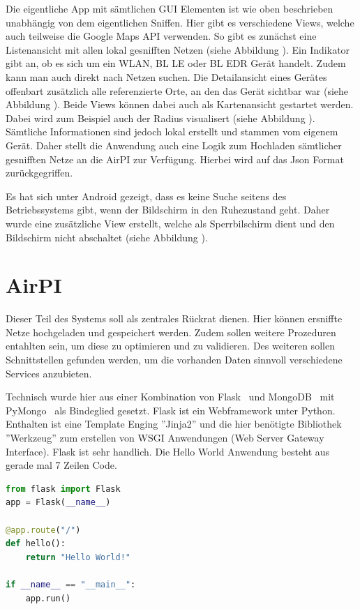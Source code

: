 \documentclass[11pt,a4paper]{article}
\begin{document}
Die eigentliche App mit sämtlichen GUI Elementen ist wie oben beschrieben unabhängig von dem eigentlichen Sniffen. Hier gibt es verschiedene Views, welche auch teilweise die Google Maps API verwenden.
So gibt es zunächst eine Listenansicht mit allen lokal gesnifften Netzen (siehe Abbildung
). Ein Indikator gibt an, ob es sich um ein WLAN, BL LE oder BL EDR Gerät handelt. Zudem kann man auch direkt nach Netzen suchen. Die Detailansicht eines Gerätes offenbart zusätzlich alle referenzierte Orte, an den das Gerät sichtbar war (siehe Abbildung
). Beide Views können dabei auch als Kartenansicht gestartet werden. Dabei wird zum Beispiel auch der Radius visualisert (siehe Abbildung
). Sämtliche Informationen sind jedoch lokal erstellt und stammen vom eigenem Gerät. Daher stellt die Anwendung auch eine Logik zum Hochladen sämtlicher gesnifften Netze an die AirPI zur Verfügung. Hierbei wird auf das Json Format zurückgegriffen. 

Es hat sich unter Android gezeigt, dass es keine Suche seitens des Betriebssystems gibt, wenn der Bildschirm in den Ruhezustand geht. Daher wurde eine zusätzliche View erstellt, welche als Sperrbilschirm dient und den Bildschirm nicht abschaltet (siehe Abbildung
).


\section{AirPI}

Dieser Teil des Systems soll als zentrales Rückrat dienen. Hier können ersniffte Netze hochgeladen und gespeichert werden. Zudem sollen weitere Prozeduren entahlten sein, um diese zu optimieren und zu validieren. 
Des weiteren sollen Schnittstellen gefunden werden, um die vorhanden Daten sinnvoll  verschiedene Services anzubieten.

Technisch wurde hier aus einer Kombination von Flask~\cite{flask} und MongoDB~\cite{mongodb} mit PyMongo~\cite{pymongo} als Bindeglied gesetzt. Flask ist ein Webframework unter Python. Enthalten ist eine Template Enging ''Jinja2'' und die hier benötigte Bibliothek ''Werkzeug'' zum erstellen von WSGI Anwendungen (Web Server Gateway Interface). Flask ist sehr handlich. Die Hello World Anwendung besteht aus gerade mal 7 Zeilen Code.

\begin{lstlisting}[language=Python]
from flask import Flask
app = Flask(__name__)

@app.route("/")
def hello():
    return "Hello World!"
    
if __name__ == "__main__":
    app.run()
\end{lstlisting}
\end{document}
